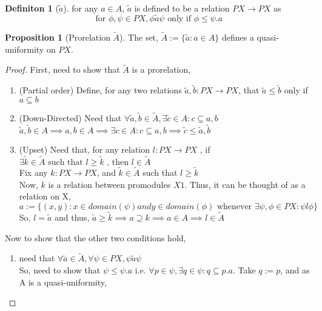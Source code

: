 \documentclass[18pt,a4paper]{article}
\makeatletter
\theoremstyle{definition}
\newtheorem{definition}{Definiton}[section]
\newtheorem{proop}{Proposition}[section]
\newcommand{\carrow}{}%
\DeclareRobustCommand{\carrow}{%
  \mathrel{\vphantom{\rightarrow}\mathpalette\circle@arrow\relax}%
}
\newcommand{\circle@arrow}[2]{%
  \m@th
  \ooalign{%
    \hidewidth$#1\circ\mkern1mu$\hidewidth\cr
    $#1\longrightarrow$\cr}%
}
\makeatother
\begin{document}
\begin{definition}[$\tilde{a}$] %
	for any $a\in A$, $\tilde{a}$ is defined to be a relation $PX \to PX$ as
	\[ \text{ for } \phi,\psi \in PX, \phi \tilde{a} \psi \text{ only if } \phi \leq \psi.a \]
\end{definition}

\begin{proop}[Prorelation $\tilde{A}$] %
	The set, $\tilde{A}:=\{\tilde{a}:a \in A\}$ defines a quasi-uniformity on $PX$.
\end{proop}
\begin{proof}
	First, need to show that $\tilde{A}$ is a prorelation,
	\begin{enumerate}[label=(\roman*)]
		\item (Partial order) Define, for any two relations $\tilde{a},\tilde{b}:PX \to PX $,
			that $ \tilde{a} \leq \tilde{b}$ only if $a \subseteq b$
		\item(Down-Directed) Need that $\forall \tilde{a} ,\tilde{b} \in \tilde{A} ,
			\exists \tilde{c} \in A : c \subseteq a,b$\\
			$\tilde{a} ,\tilde{b} \in A \implies a,b \in A \implies \exists c \in A: c \subseteq
			a,b \implies \tilde{c} \leq \tilde{a} ,\tilde{b} $
		\item (Upset) Need that, for any relation $l:PX \to PX$ , if  $\exists \tilde{k} \in
			\tilde{A} \text{ such that }  l \geq \tilde{k} \text{ , then } l \in \tilde{A} $\\
			Fix any $k:PX \to PX$, and $\tilde{k} \in \tilde{A}$ such that $l\geq \tilde{k} $\\
			Now, $k$ is a relation between promodules $X \carrow 1$. Thus, it can be thought
			of as a relation on X,\\
			$a:=\{(x,y): x \in domain(\psi) and y \in domain(\phi)
			\text{ whenever } \exists \psi,\phi \in PX: \psi l \phi\}$ \\
			So, $l=\tilde{a}$ and thus, $\tilde{a} \geq \tilde{k} \implies a \supseteq k
			\implies a\in A \implies l \in \tilde{A} $
	\end{enumerate}
Now to show that the other two conditions hold,
\begin{enumerate}[label=(\roman*)]
	\item need that $\forall \tilde{a} \in \tilde{A} , \forall \psi \in PX, \psi \tilde{a} \psi$\\
		So, need to show that $\psi \leq \psi.a$ i.e. $\forall p\in \psi, \exists q\in \psi:
		q \subseteq p.a$. Take $q:=p$, and as A is a quasi-uniformity,

\end{enumerate}
\end{proof}
\end{document}
